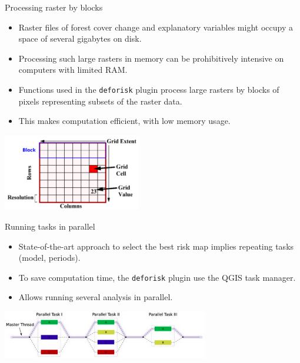 \documentclass[10pt,table,dvipsnames,compress]{beamer}
\begin{document}
\begin{frame}[label={sec:org3f9636c},fragile]{Processing raster by blocks}
 \begin{itemize}
\item Raster files of forest cover change and explanatory variables might occupy a space of several gigabytes on disk.
\item Processing such large rasters in memory can be prohibitively intensive on computers with limited RAM.
\item Functions used in the \texttt{deforisk} plugin process large rasters by blocks of pixels representing subsets of the raster data.
\item This makes computation efficient, with low memory usage.
\end{itemize}

\begin{center}
\includegraphics[width=6cm]{figs/raster_block.png}
\end{center}
\end{frame}

\begin{frame}[label={sec:org87726f7},fragile]{Running tasks in parallel}
 \begin{itemize}
\item State-of-the-art approach to select the best risk map implies repeating tasks (model, periods).
\item To save computation time, the \texttt{deforisk} plugin use the QGIS task manager.
\item Allows running several analysis in parallel.
\end{itemize}

\vspace{0.25cm}

\begin{center}
\includegraphics[width=9cm]{figs/parallel_tasks.png}
\end{center}
\end{frame}
\end{document}
